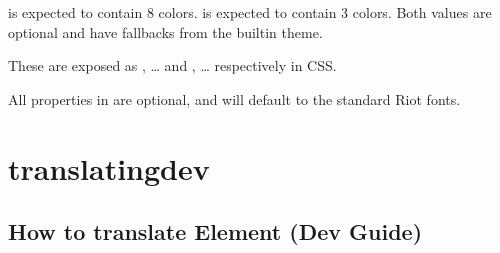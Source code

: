 \documentclass[letterpaper,10pt,openany,oneside,english]{sphinxmanual}
\begin{document}
\begin{sphinxVerbatim}[commandchars=\\\{\}]
                     
                     
                     
                     
        \PYG{p}{]}
\end{sphinxVerbatim}

\sphinxAtStartPar
{} is expected to contain 8 colors.  is expected to contain 3 colors. Both values are optional and have fallbacks from the built\sphinxhyphen{}in theme.

\sphinxAtStartPar
These are exposed as , … and , … respectively in CSS.

\sphinxAtStartPar
All properties in  are optional, and will default to the standard Riot fonts.


\chapter{translating\sphinxhyphen{}dev}
\label{\detokenize{translating-dev:translating-dev}}\label{\detokenize{translating-dev::doc}}

\section{How to translate Element (Dev Guide)}
\label{\detokenize{translating-dev:how-to-translate-element-dev-guide}}
\end{document}
